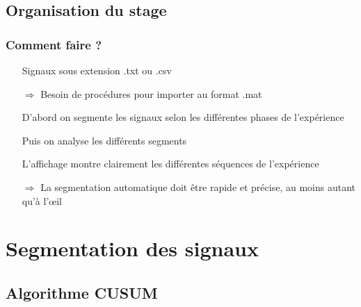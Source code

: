 \documentclass{beamer}
\begin{document}
\subsection{Organisation du stage}

\begin{frame}
	\frametitle{Comment faire ?}
	\begin{itemize}
		\item[Signaux] sous extension .txt ou .csv
		\item[$\Longrightarrow$] Besoin de procédures pour importer au format .mat
		\vspace*{0.5cm}
		\item[D'abord] on segmente les signaux selon les différentes phases de l'expérience
		\item[Puis] on analyse les différents segments
		\vspace*{0.5cm}
		\item[L'affichage] montre clairement les différentes séquences de l'expérience
		\item[$\Longrightarrow$] La segmentation automatique doit être rapide et précise, au moins autant qu'à l'œil
	\end{itemize}
\end{frame}

\section{Segmentation des signaux}


\subsection{Algorithme CUSUM}
\end{document}
